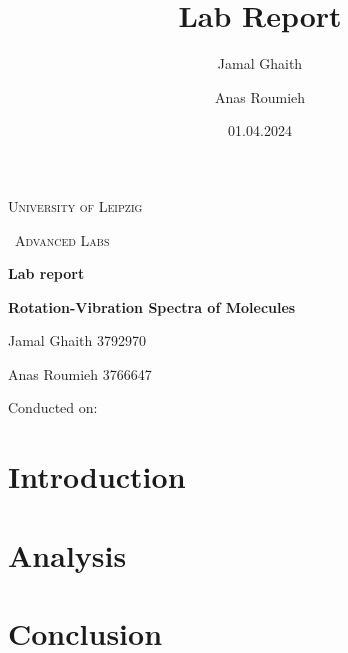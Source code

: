 \documentclass{article}
\title{Lab Report}
\author{Jamal Ghaith}
\author{Anas Roumieh}
\date{01.04.2024}
\begin{document}
\begin{titlepage}
	\centering
	{\scshape\LARGE University of Leipzig \par}
	\vspace{1cm}
	{\scshape\ Advanced Labs\par}
	\vspace{1.5cm}
	{\huge\bfseries Lab report\par}
	\vspace{2cm}
	{\huge\bfseries Rotation-Vibration Spectra of Molecules\par}
	\vspace{2cm}
	{\Large Jamal Ghaith 3792970\par}
    {\Large Anas Roumieh 3766647\par}
	\vfill

    {\Large Conducted on: \par}
	\vfill
\end{titlepage}


\tableofcontents
{}
\pagebreak{}

\section{Introduction}

\pagebreak{}

\section{Analysis}

\pagebreak{}

\section{Conclusion}

\pagebreak{}
\end{document}
